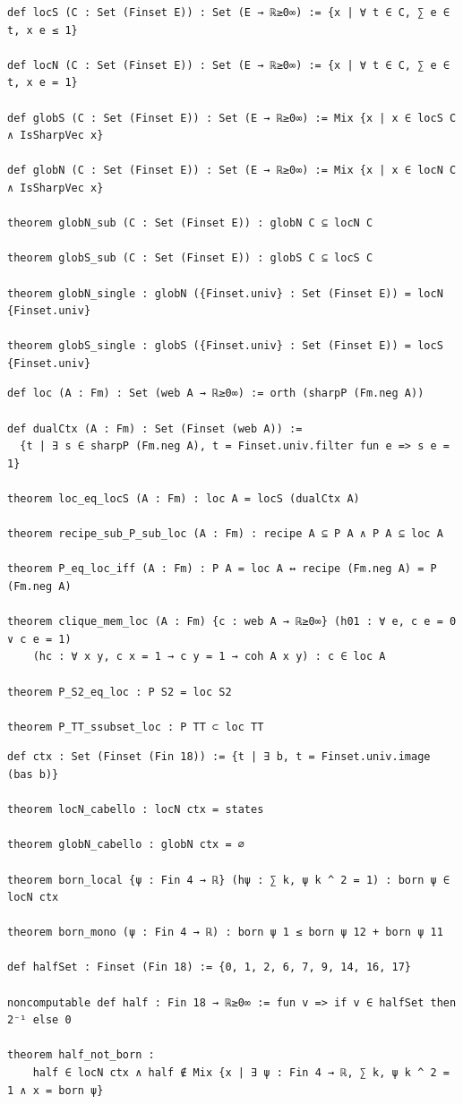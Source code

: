 \label{lean:local-calc}
\begin{lstlisting}
def locS (C : Set (Finset E)) : Set (E → ℝ≥0∞) := {x | ∀ t ∈ C, ∑ e ∈ t, x e ≤ 1}

def locN (C : Set (Finset E)) : Set (E → ℝ≥0∞) := {x | ∀ t ∈ C, ∑ e ∈ t, x e = 1}

def globS (C : Set (Finset E)) : Set (E → ℝ≥0∞) := Mix {x | x ∈ locS C ∧ IsSharpVec x}

def globN (C : Set (Finset E)) : Set (E → ℝ≥0∞) := Mix {x | x ∈ locN C ∧ IsSharpVec x}

theorem globN_sub (C : Set (Finset E)) : globN C ⊆ locN C

theorem globS_sub (C : Set (Finset E)) : globS C ⊆ locS C

theorem globN_single : globN ({Finset.univ} : Set (Finset E)) = locN {Finset.univ}

theorem globS_single : globS ({Finset.univ} : Set (Finset E)) = locS {Finset.univ}
\end{lstlisting}

\label{lean:loc-linear}
\begin{lstlisting}
def loc (A : Fm) : Set (web A → ℝ≥0∞) := orth (sharpP (Fm.neg A))

def dualCtx (A : Fm) : Set (Finset (web A)) :=
  {t | ∃ s ∈ sharpP (Fm.neg A), t = Finset.univ.filter fun e => s e = 1}

theorem loc_eq_locS (A : Fm) : loc A = locS (dualCtx A)

theorem recipe_sub_P_sub_loc (A : Fm) : recipe A ⊆ P A ∧ P A ⊆ loc A

theorem P_eq_loc_iff (A : Fm) : P A = loc A ↔ recipe (Fm.neg A) = P (Fm.neg A)

theorem clique_mem_loc (A : Fm) {c : web A → ℝ≥0∞} (h01 : ∀ e, c e = 0 ∨ c e = 1)
    (hc : ∀ x y, c x = 1 → c y = 1 → coh A x y) : c ∈ loc A

theorem P_S2_eq_loc : P S2 = loc S2

theorem P_TT_ssubset_loc : P TT ⊂ loc TT
\end{lstlisting}

\label{lean:loc-quantum}
\begin{lstlisting}
def ctx : Set (Finset (Fin 18)) := {t | ∃ b, t = Finset.univ.image (bas b)}

theorem locN_cabello : locN ctx = states

theorem globN_cabello : globN ctx = ∅

theorem born_local {ψ : Fin 4 → ℝ} (hψ : ∑ k, ψ k ^ 2 = 1) : born ψ ∈ locN ctx

theorem born_mono (ψ : Fin 4 → ℝ) : born ψ 1 ≤ born ψ 12 + born ψ 11

def halfSet : Finset (Fin 18) := {0, 1, 2, 6, 7, 9, 14, 16, 17}

noncomputable def half : Fin 18 → ℝ≥0∞ := fun v => if v ∈ halfSet then 2⁻¹ else 0

theorem half_not_born :
    half ∈ locN ctx ∧ half ∉ Mix {x | ∃ ψ : Fin 4 → ℝ, ∑ k, ψ k ^ 2 = 1 ∧ x = born ψ}
\end{lstlisting}

